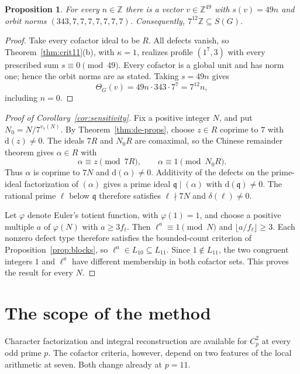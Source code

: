 \documentclass[11pt]{amsart}
\theoremstyle{plain}
\newtheorem{proposition}[theorem]{Proposition}
\theoremstyle{definition}
\numberwithin{equation}{section}
\newcommand{\Z}{\mathbb Z}
\newcommand{\GG}{G}
\newcommand{\qq}{\mathfrak q}
\newcommand{\dd}{\mathrm d}
\begin{document}
\begin{proposition}\label{prop:witness12}
For every $n\in\Z$ there is a vector $v\in\Z^{49}$ with
$s(v)=49n$ and orbit norms $(343,7,7,7,7,7,7,7)$. Consequently,
$7^{12}\Z\subseteq S(\GG)$.
\end{proposition}
\begin{proof}
Take every cofactor ideal to be $R$. All defects vanish, so
Theorem~\ref{thm:crit11}(b), with $\kappa=1$, realizes profile
$(1^7,3)$ with every prescribed sum $s\equiv0\pmod{49}$.
Every cofactor is a global unit and has norm one; hence the
orbit norms are as stated. Taking $s=49n$ gives
\[
 \Theta_\GG(v)=49n\cdot343\cdot7^7=7^{12}n,
\]
including $n=0$.
\end{proof}


\begin{proof}[Proof of Corollary~\ref{cor:sensitivity}]
Fix a positive integer $N$, and put $N_0=N/7^{v_7(N)}$.
By Theorem~\ref{thm:de-props}, choose $z\in R$ coprime to $7$
with $\dd(z)\ne0$. The ideals $7R$ and $N_0R$ are comaximal,
so the Chinese remainder theorem gives $\alpha\in R$ with
\[
 \alpha\equiv z\pmod{7R},\qquad
 \alpha\equiv1\pmod{N_0R}.
\]
Thus $\alpha$ is coprime to $7N$ and $\dd(\alpha)\ne0$.
Additivity of the defects on the prime-ideal factorization of
$(\alpha)$ gives a prime ideal $\qq\mid(\alpha)$ with
$\dd(\qq)\ne0$. The rational prime $\ell$ below $\qq$ therefore
satisfies $\ell\nmid7N$ and $\delta(\ell)\ne0$.

Let $\varphi$ denote Euler's totient function, with $\varphi(1)=1$,
and choose a positive multiple $a$ of $\varphi(N)$ with
$a\ge3f_\ell$. Then $\ell^a\equiv1\pmod N$ and
$\lfloor a/f_\ell\rfloor\ge3$. Each nonzero defect type therefore
satisfies the bounded-count criterion of Proposition~\ref{prop:blocks},
so $\ell^a\in L_{10}\subseteq L_{11}$. Since $1\notin L_{11}$,
the two congruent integers $1$ and $\ell^a$ have different membership
in both cofactor sets. This proves the result for every $N$.
\end{proof}


\section{The scope of the method}\label{sec:larger-primes}

Character factorization and integral reconstruction are available for
$C_p^2$ at every odd prime $p$. The cofactor criteria, however, depend
on two features of the local arithmetic at seven. Both change
already at $p=11$.
\end{document}
